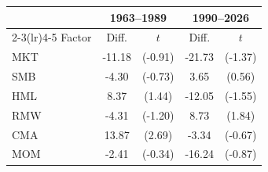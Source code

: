 \begin{tabular}{lcccc}
\toprule
 & \multicolumn{2}{c}{1963--1989} & \multicolumn{2}{c}{1990--2026} \\
\cmidrule(lr){2-3}\cmidrule(lr){4-5}
Factor & Diff. & $t$ & Diff. & $t$ \\
\midrule
MKT & -11.18 & (-0.91) & -21.73 & (-1.37) \\
SMB & -4.30 & (-0.73) & 3.65 & (0.56) \\
HML & 8.37 & (1.44) & -12.05 & (-1.55) \\
RMW & -4.31 & (-1.20) & 8.73 & (1.84) \\
CMA & 13.87 & (2.69) & -3.34 & (-0.67) \\
MOM & -2.41 & (-0.34) & -16.24 & (-0.87) \\
\bottomrule
\end{tabular}
